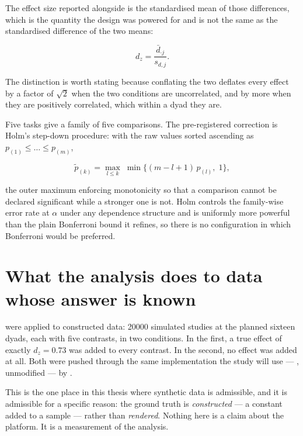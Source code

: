 The effect size reported alongside is the standardised mean of those
differences, which is the quantity the design was powered for and is not the
same as the standardised difference of the two means:

\begin{equation}
  \label{eq:dz}
  d_z = \frac{\bar{d}_{\cdot j}}{s_{d,j}} .
\end{equation}

The distinction is worth stating because conflating the two deflates every
effect by a factor of $\sqrt{2}$ when the two conditions are uncorrelated, and
by more when they are positively correlated, which within a dyad they are.

Five tasks give a family of five comparisons. The pre-registered correction is
Holm's step-down procedure: with the raw values sorted ascending as
$p_{(1)} \le \dots \le p_{(m)}$,

\begin{equation}
  \label{eq:holm}
  \tilde{p}_{(k)} = \max_{l \le k}\;
    \min\bigl\{(m - l + 1)\,p_{(l)},\; 1\bigr\} ,
\end{equation}

the outer maximum enforcing monotonicity so that a comparison cannot be
declared significant while a stronger one is not. Holm controls the family-wise
error rate at $\alpha$ under any dependence structure and is uniformly more
powerful than the plain Bonferroni bound it refines, so there is no
configuration in which Bonferroni would be preferred.

\section{What the analysis does to data whose answer is known}
\label{sec:pipeline-validation}

 were applied to constructed data:
\num{20000} simulated studies at the planned sixteen dyads, each with five
contrasts, in two conditions. In the first, a true effect of exactly
$d_z = \num{0.73}$ was added to every contrast. In the second, no effect was
added at all. Both were pushed through the same implementation the study will
use --- , unmodified --- by
.

This is the one place in this thesis where synthetic data is admissible, and
it is admissible for a specific reason: the ground truth is \emph{constructed}
--- a constant added to a sample --- rather than \emph{rendered}. Nothing here
is a claim about the platform. It is a measurement of the analysis.

